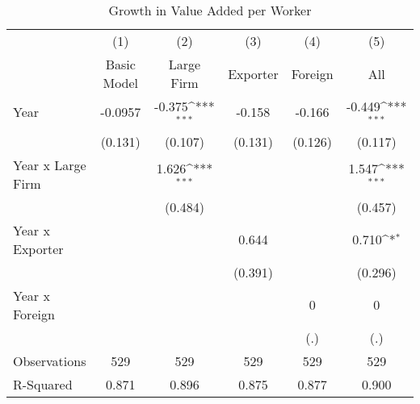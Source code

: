 \begin{table}[htbp]\centering
\def\sym#1{\ifmmode^{#1}\else\(^{#1}\)\fi}
\caption{Growth in Value Added per Worker}
\begin{tabular}{l*{5}{c}}
\hline\hline
            &\multicolumn{1}{c}{(1)}&\multicolumn{1}{c}{(2)}&\multicolumn{1}{c}{(3)}&\multicolumn{1}{c}{(4)}&\multicolumn{1}{c}{(5)}\\
            &\multicolumn{1}{c}{Basic Model}&\multicolumn{1}{c}{Large Firm}&\multicolumn{1}{c}{Exporter}&\multicolumn{1}{c}{Foreign}&\multicolumn{1}{c}{All}\\
\hline
Year        &     -0.0957         &      -0.375\sym{***}&      -0.158         &      -0.166         &      -0.449\sym{***}\\
            &     (0.131)         &     (0.107)         &     (0.131)         &     (0.126)         &     (0.117)         \\
[1em]
Year x Large Firm&                     &       1.626\sym{***}&                     &                     &       1.547\sym{***}\\
            &                     &     (0.484)         &                     &                     &     (0.457)         \\
[1em]
Year x Exporter&                     &                     &       0.644         &                     &       0.710\sym{*}  \\
            &                     &                     &     (0.391)         &                     &     (0.296)         \\
[1em]
Year x Foreign&                     &                     &                     &           0         &           0         \\
            &                     &                     &                     &         (.)         &         (.)         \\
\hline
Observations&         529         &         529         &         529         &         529         &         529         \\
R-Squared   &       0.871         &       0.896         &       0.875         &       0.877         &       0.900         \\
\hline\hline
\end{tabular}
\end{table}

